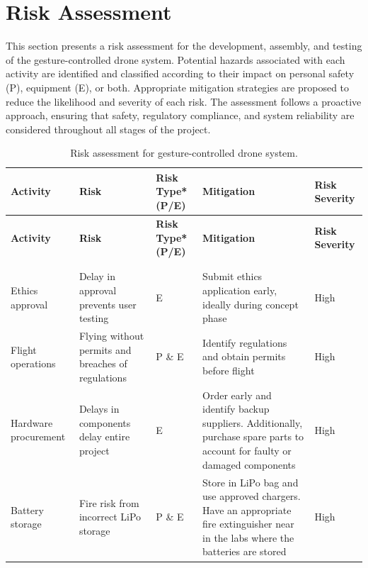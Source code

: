 \chapter{Risk Assessment}
\noindent This section presents a risk assessment for the development, assembly, and testing of the gesture-controlled drone system. Potential hazards associated with each activity are identified and classified according to their impact on personal safety (P), equipment (E), or both. Appropriate mitigation strategies are proposed to reduce the likelihood and severity of each risk. The assessment follows a proactive approach, ensuring that safety, regulatory compliance, and system reliability are considered throughout all stages of the project.

{
\footnotesize
\setlength{\tabcolsep}{3pt}
\begin{longtable}{|>{\raggedright\arraybackslash}p{}|>{\raggedright\arraybackslash}p{}|>{\centering\arraybackslash}p{1.2cm}|>{\raggedright\arraybackslash}p{}|>{\centering\arraybackslash}p{2.0cm}|}
\caption{Risk assessment for gesture-controlled drone system.} \\
\hline
\rowcolor{gray!30}
\textbf{Activity} & \textbf{Risk} & \textbf{Risk Type* (P/E)} & \textbf{Mitigation} & \textbf{Risk Severity} \\
\hline
\endfirsthead

\hline
\rowcolor{gray!30}
\textbf{Activity} & \textbf{Risk} & \textbf{Risk Type* (P/E)} & \textbf{Mitigation} & \textbf{Risk Severity} \\
\hline
\endhead

\hline \multicolumn{5}{r}{\textit{Continued on next page}} \\
\endfoot
\hline
\endlastfoot

\multicolumn{5}{|l|}{\textbf{General}} \\
\hline
Ethics approval & Delay in approval prevents user testing & E & Submit ethics application early, ideally during concept phase & High \\
\hline
Flight operations & Flying without permits and breaches of regulations & P \& E & Identify regulations and obtain permits before flight & High \\
\hline
Hardware procurement & Delays in components delay entire project & E & Order early and identify backup suppliers. Additionally, purchase spare parts to account for faulty or damaged components & High \\
\hline
Battery storage & Fire risk from incorrect LiPo storage & P \& E & Store in LiPo bag and use approved chargers. Have an appropriate fire extinguisher near in the labs where the batteries are stored & High \\
\hline


\end{longtable}}
